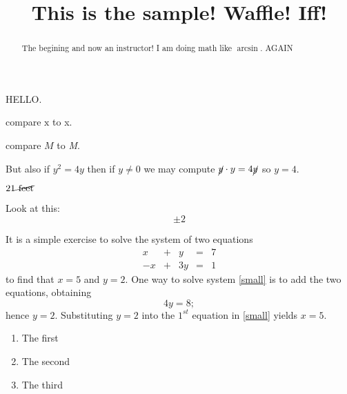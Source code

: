 \documentclass{ximera}
\title[Breal-grond]{This is the sample! Waffle!  Iff!}
\begin{document}
\begin{abstract}
  The begining and now an instructor! I am doing math like $\arcsin$. AGAIN
\end{abstract}

\maketitle

HELLO.


compare $\mathrm{x}$ to x.

compare $M$ to \textit{M}.

But also if $y^2 = 4y$ then if $y \neq 0$ we may compute $\cancel{y} \cdot y = 4 \cancel{y}$ so $y = 4$.

$21 \cancel{\textrm{ feet}}$

Look at this:
\[
  \pm 2
\]








It is a simple exercise to solve the system of two equations
\begin{equation} \label{small}
\begin{array}{rcrcr}
 x & + & y & = & 7 \\
-x & + & 3y & = & 1
\end{array}
\end{equation}
to find that $x=5$ and $y=2$.  One way to solve
system \eqref{small} is to add the two equations, obtaining
\[
4y=8;
\]
hence $y=2$.  Substituting $y=2$ into the $1^{st}$ equation in
\ref{small} yields $x=5$.

\begin{enumerate}
\item\label{item:one} The first
\item The second
\item\label{item:three} The third
\end{enumerate}
\end{document}
